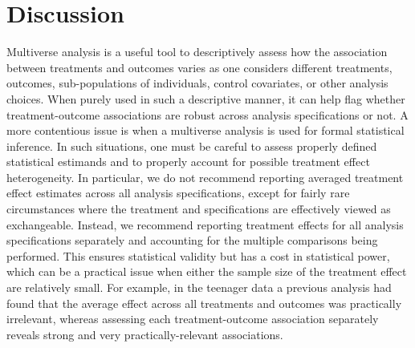 \documentclass[pdflatex,sn-mathphys-num]{sn-jnl}%
\theoremstyle{thmstyleone}%
\theoremstyle{thmstyletwo}%
\theoremstyle{thmstylethree}%
\begin{document}





\section{Discussion}
\label{sec:discussion}


Multiverse analysis is a useful tool to descriptively assess how the association between treatments and outcomes varies as one considers different treatments, outcomes, sub-populations of individuals, control covariates, or other analysis choices. When purely used in such a descriptive manner, it can help flag whether treatment-outcome associations are robust across analysis specifications or not.
A more contentious issue is when a multiverse analysis is used for formal statistical inference. In such situations, one must be careful to assess properly defined statistical estimands and to properly account for possible treatment effect heterogeneity. In particular, we do not recommend reporting averaged treatment effect estimates across all analysis specifications, except for fairly rare circumstances where the treatment and specifications are effectively viewed as exchangeable.
Instead, we recommend reporting treatment effects for all analysis specifications separately and accounting for the multiple comparisons being performed. This ensures statistical validity but has a cost in statistical power, which can be a practical issue when either the sample size of the treatment effect are relatively small.
For example, in the teenager data a previous analysis had found that the average effect across all treatments and outcomes was practically irrelevant, whereas assessing each treatment-outcome association separately reveals strong and very practically-relevant associations.
\end{document}
